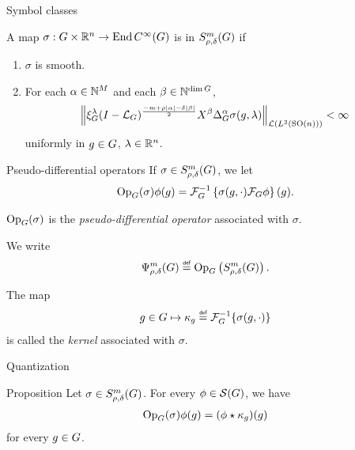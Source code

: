 \documentclass{beamer}
\begin{document}
\begin{frame}{Symbol classes}
    \begin{definition}
        A map $\sigma: G \times \mathbb{R}^n \to \operatorname{End} {{C^\infty(G)}}$ is in $S^{m}_{\rho, \delta}(G)$ if
        \begin{enumerate}
            \item
                $\sigma$ is smooth.
            \item
                For each $\alpha \in \mathbb{N}^M$ and each $\beta \in \mathbb{N}^{\dim G}$,
                \begin{align*}
                    \norm [\Lin {\Lebesgue 2 {\SpecialOrthogonalGroup n}}] {
                        \Rep \lambda \BesselPotential {-m + \rho \abs \alpha - \delta \abs \beta}
                        \LeftDifferentialOperator \beta \DifferenceOperatorOrder \alpha \sigma(g, \lambda)
                    } < \infty
                \end{align*}
                uniformly in $g \in G$, $\lambda \in \mathbb{R}^n$.
        \end{enumerate}
    \end{definition}
\end{frame}

\begin{frame}{Pseudo-differential operators}
    If $\sigma \in S^{m}_{\rho, \delta}(G)$,
    we let
    \begin{align*}
        \mathrm{Op}_{G}(\sigma) \phi(g) = \mathcal{F}^{-1}_{G} \left\{ \sigma(g, \cdot) \mathcal{F}_{G} \phi \right\}(g).
    \end{align*}

    $\mathrm{Op}_{G}(\sigma)$ is the \emph{pseudo-differential operator} associated with $\sigma$.

    We write
    \begin{align*}
        \OperatorClass m {\rho, \delta} \defeq \Op \left(\SymbolClass m {\rho, \delta}\right).
    \end{align*}

    \pause

    The map
    \begin{align*}
        g \in \Group \mapsto \kappa_g \defeq \InverseFourier \{\sigma(g, \dummy)\}
    \end{align*}
    is called the \emph{kernel} associated with $\sigma$.
\end{frame}

\begin{frame}{Quantization}
    \begin{block}{Proposition}
        Let $\sigma \in S^{m}_{\rho, \delta}(G)$.
        For every $\phi \in {\mathcal{S} (G)}$,
        we have
        \begin{align*}
            \mathrm{Op}_{G}(\sigma) \phi(g) = (\phi \star \kappa_g)(g)
        \end{align*}
        for every $g \in G$.
    \end{block}
\end{frame}
\end{document}
